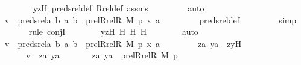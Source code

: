 \begin{isabellebody}
\ \ \ \ \ \ \isamarkupfalse%
\ yzH\ preds{\isacharunderscore}{\kern0pt}rel{\isacharunderscore}{\kern0pt}def\ Rrel{\isacharunderscore}{\kern0pt}def\ assms\ \isanewline
\ \ \ \ \ \ \isamarkupfalse%
\ auto\isanewline
\isanewline
\ \ \ \ \isamarkupfalse%
\ {\isachardoublequoteopen}v\ {\isasymin}\ preds{\isacharunderscore}{\kern0pt}rel{\isacharparenleft}{\kern0pt}{\isasymlambda}a\ b{\isachardot}{\kern0pt}\ {\isasymlangle}a{\isacharcomma}{\kern0pt}\ b{\isasymrangle}\ {\isasymin}\ prel{\isacharparenleft}{\kern0pt}Rrel{\isacharparenleft}{\kern0pt}R{\isacharcomma}{\kern0pt}\ M{\isacharparenright}{\kern0pt}{\isacharcomma}{\kern0pt}\ p{\isacharparenright}{\kern0pt}{\isacharcomma}{\kern0pt}\ {\isasymlangle}x{\isacharcomma}{\kern0pt}\ a{\isasymrangle}{\isacharparenright}{\kern0pt}{\isachardoublequoteclose}\ \isanewline
\ \ \ \ \ \ \isamarkupfalse%
\ preds{\isacharunderscore}{\kern0pt}rel{\isacharunderscore}{\kern0pt}def\ \isanewline
\ \ \ \ \ \ \isamarkupfalse%
\ simp\isanewline
\ \ \ \ \ \ \isamarkupfalse%
{\isacharparenleft}{\kern0pt}rule\ conjI{\isacharparenright}{\kern0pt}\isanewline
\ \ \ \ \ \ \isamarkupfalse%
\ yzH\ H{}\ H{}\ H{}\isanewline
\ \ \ \ \ \ \isamarkupfalse%
\ auto\isanewline
\ \ \isamarkupfalse%
\ \isanewline
\ \ \ \ \isamarkupfalse%
\ {\isachardoublequoteopen}v\ {\isasymin}\ preds{\isacharunderscore}{\kern0pt}rel{\isacharparenleft}{\kern0pt}{\isasymlambda}a\ b{\isachardot}{\kern0pt}\ {\isasymlangle}a{\isacharcomma}{\kern0pt}\ b{\isasymrangle}\ {\isasymin}\ prel{\isacharparenleft}{\kern0pt}Rrel{\isacharparenleft}{\kern0pt}R{\isacharcomma}{\kern0pt}\ M{\isacharparenright}{\kern0pt}{\isacharcomma}{\kern0pt}\ p{\isacharparenright}{\kern0pt}{\isacharcomma}{\kern0pt}\ {\isasymlangle}x{\isacharcomma}{\kern0pt}\ a{\isasymrangle}{\isacharparenright}{\kern0pt}{\isachardoublequoteclose}\ \isanewline
\isanewline
\ \ \ \ \isamarkupfalse%
\ \isamarkupfalse%
\ za\ ya\ \ zyH\ {\isacharcolon}{\kern0pt}\ \isanewline
\ \ \ \ \ \ {\isachardoublequoteopen}v\ {\isacharequal}{\kern0pt}\ {\isacharless}{\kern0pt}za{\isacharcomma}{\kern0pt}\ ya{\isachargreater}{\kern0pt}{\isachardoublequoteclose}\ \isanewline
\ \ \ \ \ \ {\isachardoublequoteopen}{\isasymlangle}za{\isacharcomma}{\kern0pt}\ ya{\isasymrangle}\ {\isasymin}\ prel{\isacharparenleft}{\kern0pt}Rrel{\isacharparenleft}{\kern0pt}R{\isacharcomma}{\kern0pt}\ M{\isacharparenright}{\kern0pt}{\isacharcomma}{\kern0pt}\ p{\isacharparenright}{\kern0pt}{\isachardoublequoteclose}\ \isanewline

\end{isabellebody}
